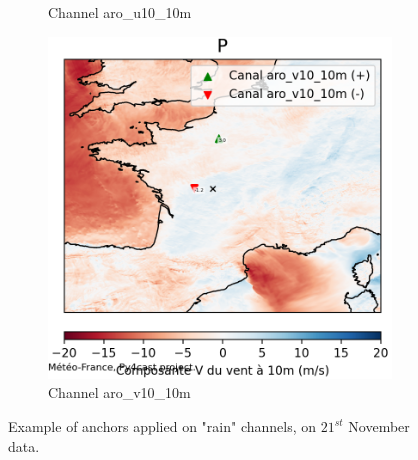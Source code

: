 \begin{figure}[h]
\begin{subfigure}[b]{0.49\textwidth}
        \caption{Channel aro\_u10\_10m}
    \end{subfigure}
    \hfill
    \begin{subfigure}[b]{0.49\textwidth}
        \includegraphics[width=\textwidth]{Images/titan_rain_anchors/nov-21/2023112100_feature_aro_v10_10m.png}
        \caption{Channel aro\_v10\_10m}
    \end{subfigure}
    \caption{Example of anchors applied on "rain" channels, on $21^{st}$ November data.}
    \label{fig:titan-rain-anchors-21}
\end{figure}